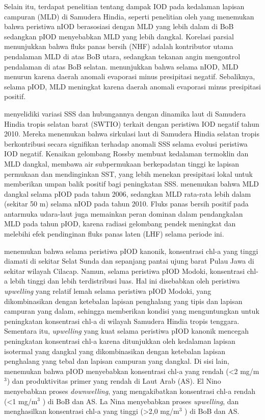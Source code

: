 \begin{spacing}{1.5}
	Selain itu, terdapat penelitian tentang dampak IOD pada kedalaman lapisan campuran (MLD) di Samudera Hindia, seperti penelitian oleh  yang menemukan bahwa peristiwa nIOD berasosiasi dengan MLD yang lebih dalam di BoB sedangkan pIOD menyebabkan MLD yang lebih dangkal. Korelasi parsial menunjukkan bahwa fluks panas bersih (NHF) adalah kontributor utama pendalaman MLD di atas BoB utara, sedangkan tekanan angin mengontrol pendalaman di atas BoB selatan.  menunjukkan bahwa selama nIOD, MLD menurun karena daerah anomali evaporasi minus presipitasi negatif. Sebaliknya, selama pIOD, MLD meningkat karena daerah anomali evaporasi minus presipitasi positif. 
	
	 menyelidiki variasi SSS dan hubungannya dengan dinamika laut di Samudera Hindia tropis selatan barat (SWTIO) terkait dengan peristiwa IOD negatif tahun 2010. Mereka menemukan bahwa sirkulasi laut di Samudera Hindia selatan tropis berkontribusi secara signifikan terhadap anomali SSS selama evolusi peristiwa IOD negatif. Kenaikan gelombang Rossby membuat kedalaman termoklin dan MLD dangkal, membawa air subpermukaan berkepadatan tinggi ke lapisan permukaan dan mendinginkan SST, yang lebih menekan presipitasi lokal untuk memberikan umpan balik positif bagi peningkatan SSS.  menemukan bahwa MLD dangkal selama pIOD pada tahun 2006, sedangkan MLD rata-rata lebih dalam (sekitar 50 m) selama nIOD pada tahun 2010. Fluks panas bersih positif pada antarmuka udara-laut juga memainkan peran dominan dalam pendangkalan MLD pada tahun pIOD, karena radiasi gelombang pendek meningkat dan melebihi efek pendinginan fluks panas laten (LHF) selama periode ini. 
	
	 menemukan bahwa selama peristiwa pIOD kanonik, konsentrasi chl-a yang tinggi diamati di sekitar Selat Sunda dan sepanjang pantai ujung barat Pulau Jawa di sekitar wilayah Cilacap. Namun, selama peristiwa pIOD Modoki, konsentrasi chl-a lebih tinggi dan lebih terdistribusi luas. Hal ini disebabkan oleh peristiwa \textit{upwelling} yang relatif lemah selama peristiwa pIOD Modoki, yang dikombinasikan dengan ketebalan lapisan penghalang yang tipis dan lapisan campuran yang dalam, sehingga memberikan kondisi yang menguntungkan untuk peningkatan konsentrasi chl-a di wilayah Samudera Hindia tropis tenggara. Sementara itu, \textit{upwelling} yang kuat selama peristiwa pIOD kanonik mencegah peningkatan konsentrasi chl-a karena ditunjukkan oleh kedalaman lapisan isotermal yang dangkal yang dikombinasikan dengan ketebalan lapisan penghalang yang tebal dan lapisan campuran yang dangkal. Di sisi lain,  menemukan bahwa pIOD menyebabkan konsentrasi chl-a yang rendah (<2 mg/m$^3$) dan produktivitas primer yang rendah di Laut Arab (AS). El Nino menyebabkan proses \textit{downwelling}, yang mengakibatkan konsentrasi chl-a rendah (<1 mg/m$^3$ ) di BoB dan AS. La Nina menyebabkan proses \textit{upwelling}, dan menghasilkan konsentrasi chl-a yang tinggi (>2,0 mg/m$^3$ ) di BoB dan AS. 
	

\end{spacing}
